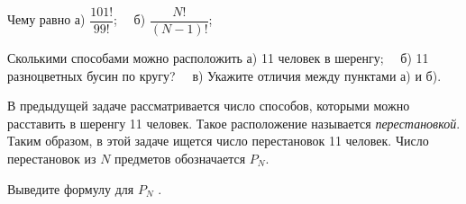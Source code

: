 \begin{ex}\label{u20}
	Чему равно а) $\dfrac{101!}{99!}$;~~  б) $\dfrac{N!}{(N-1)!}$;  
\end{ex}

\begin{thm}
	Сколькими способами можно расположить а) 11 человек в шеренгу;~~ б) 11 разноцветных бусин по кругу?~~ в) Укажите отличия между пунктами а) и б).  
\end{thm}

В предыдущей задаче рассматривается число способов, которыми можно расставить в шеренгу 11 человек. Такое расположение называется \textit{перестановкой}. Таким образом, в этой задаче ищется число перестановок 11 человек. Число перестановок из $N$ предметов обозначается $P_N$.

\begin{thm}\label{3.6}
	Выведите формулу для $P_N$ .
\end{thm}